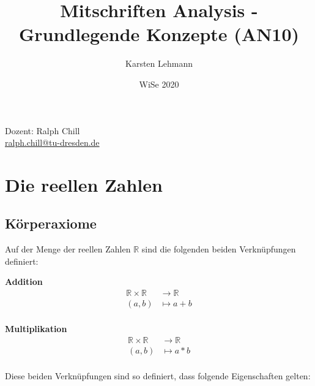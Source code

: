\documentclass{article}
\author{Karsten Lehmann}
\date{WiSe 2020}
\title{Mitschriften Analysis - Grundlegende Konzepte (AN10)}
\begin{document}
\maketitle

\vfill
\begin{center}
  Dozent: Ralph Chill \\
  \href{mailto:ralph.chill@tu-dresden.de}{ralph.chill@tu-dresden.de}
\end{center}

\newpage

\section{Die reellen Zahlen}

\subsection{Körperaxiome}

Auf der Menge der reellen Zahlen $\mathbb{R}$ sind die folgenden beiden Verknüpfungen definiert: \\

\begin{minipage}{.45\textwidth}
  \textbf{Addition}
  \begin{align*}
    \mathbb{R} \times \mathbb{R} &\to \mathbb{R} \\
    (a,b) &\mapsto a + b \\
  \end{align*}
\end{minipage}
\hfill
\vrule
\hfill
\begin{minipage}{.45\textwidth}
  \textbf{Multiplikation}
  \begin{align*}
    \mathbb{R} \times \mathbb{R} &\to \mathbb{R} \\
    (a,b) &\mapsto a * b \\
  \end{align*}
\end{minipage}

Diese beiden Verknüpfungen sind so definiert, dass folgende Eigenschaften gelten:
\end{document}
